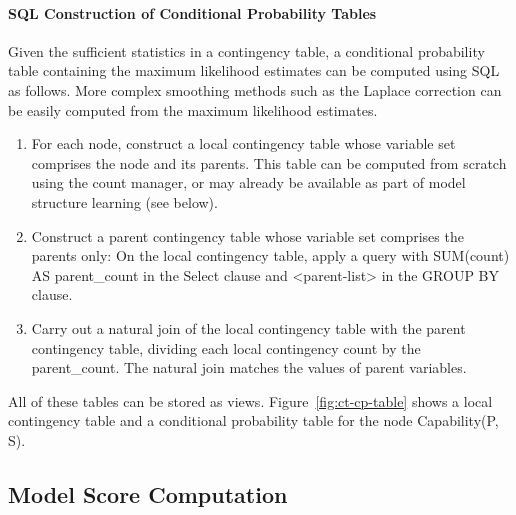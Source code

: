\documentclass{acm_proc_article-sp}
\begin{document}
\paragraph{SQL Construction of Conditional Probability Tables} Given the sufficient statistics in a contingency table, a conditional probability table containing the maximum likelihood estimates can be computed using SQL as follows. More complex smoothing methods such as the Laplace correction can be easily computed from the maximum likelihood estimates.
\begin{enumerate}
\item For each node, construct a local contingency table whose variable set comprises the node and its parents. This table can be computed from scratch using the count manager, or may already be available as part of model structure learning (see below). 
\item Construct a  parent contingency table whose variable set comprises the parents only:  On the local contingency table, apply a query with SUM(count) AS parent\_count in the Select clause and <parent-list> in the GROUP BY clause. 
\item Carry out a natural join of the local contingency table with the parent contingency table, dividing each local contingency count by the parent\_count. The natural join matches the values of parent variables. 
\end{enumerate}

All of these tables can be stored as views. 
Figure~\ref{fig:ct-cp-table} shows a local contingency table and a conditional probability table for the node Capability(P, S). 



\subsection{Model Score Computation} \label{sec:model-score}
\end{document}
